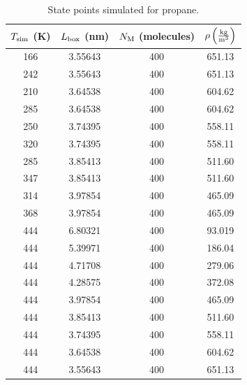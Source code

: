 \documentclass[journal=jctc,manuscript=article]{achemso}
\begin{document}
\begin{table}[p!]
	\caption{State points simulated for propane.} \label{tab:C3H8 state points}
	\begin{center}
		\begin{tabular}{|c|c|c|c|}
			\hline
			$T_{\rm sim}$ (K) & $L_{\rm box}$ (nm) & $N_{\rm M}$ (molecules) & $\rho \left(\frac{\rm kg}{\rm m^3}\right)$ \\ \hline
			166 & 3.55643  & 400 & 651.13 \\
			242 & 3.55643  & 400 & 651.13 \\
			210 & 3.64538 & 400 & 604.62 \\
			285 & 3.64538 & 400 & 604.62 \\
			250 & 3.74395 & 400 & 558.11 \\
			320 & 3.74395 & 400 & 558.11 \\
			285 & 3.85413 & 400 & 511.60 \\
			347 & 3.85413 & 400 & 511.60 \\
			314 & 3.97854 & 400 & 465.09 \\
			368 & 3.97854 & 400 & 465.09 \\
			444 & 6.80321 & 400 & 93.019 \\
			444 & 5.39971 & 400 & 186.04 \\
			444 & 4.71708  & 400 & 279.06 \\
			444 & 4.28575 & 400 & 372.08 \\
			444 & 3.97854 & 400 & 465.09 \\
			444 & 3.85413 & 400 & 511.60 \\
			444 & 3.74395 & 400 & 558.11 \\
			444 & 3.64538 & 400 & 604.62 \\
			444 & 3.55643  & 400 & 651.13 \\
			\hline
		\end{tabular}
	\end{center}
\end{table}
\end{document}
